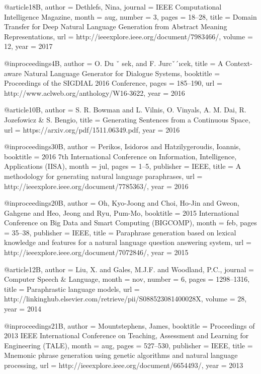 @article{18B,
  author = {Dethlefs, Nina},
  journal = {IEEE Computational Intelligence Magazine},
  month = {aug},
  number = {3},
  pages = {18--28},
  title = {Domain Transfer for Deep Natural Language Generation from Abstract Meaning Representations},
  url = {http://ieeexplore.ieee.org/document/7983466/},
  volume = {12},
  year = {2017}
}

@inproceedings{4B,
  author = {O. Du ˇ sek,  and F. Jurcˇ´ıcek},
  title = {A Context-aware Natural Language Generator for Dialogue Systems},
  booktitle = {Proceedings of the SIGDIAL 2016 Conference},
  pages = {185--190},
  url = {http://www.aclweb.org/anthology/W16-3622},
  year = {2016}
}

@article{10B,
  author = {S. R. Bowman and L. Vilnis, O. Vinyals, A. M. Dai, R. Jozefowicz & S. Bengio},
  title = {Generating Sentences from a Continuous Space},
  url = {https://arxiv.org/pdf/1511.06349.pdf},
  year = {2016}
}

@inproceedings{30B,
author = {Perikos, Isidoros and Hatzilygeroudis, Ioannis},
booktitle = {2016 7th International Conference on Information, Intelligence, Applications (IISA)},
month = {jul},
pages = {1--5},
publisher = {IEEE},
title = {{A methodology for generating natural language paraphrases}},
url = {http://ieeexplore.ieee.org/document/7785363/},
year = {2016}
}

@inproceedings{20B,
author = {Oh, Kyo-Joong and Choi, Ho-Jin and Gweon, Gahgene and Heo, Jeong and Ryu, Pum-Mo},
booktitle = {2015 International Conference on Big Data and Smart Computing (BIGCOMP)},
month = {feb},
pages = {35--38},
publisher = {IEEE},
title = {Paraphrase generation based on lexical knowledge and features for a natural language question answering system},
url = {http://ieeexplore.ieee.org/document/7072846/},
year = {2015}
}

@article{12B,
author = {Liu, X. and Gales, M.J.F. and Woodland, P.C.},
journal = {Computer Speech {\&} Language},
month = {nov},
number = {6},
pages = {1298--1316},
title = {Paraphrastic language models},
url = {http://linkinghub.elsevier.com/retrieve/pii/S088523081400028X},
volume = {28},
year = {2014}
}

@inproceedings{21B,
author = {Mountstephens, James},
booktitle = {Proceedings of 2013 IEEE International Conference on Teaching, Assessment and Learning for Engineering (TALE)},
month = {aug},
pages = {527--530},
publisher = {IEEE},
title = {Mnemonic phrase generation using genetic algorithms and natural language processing},
url = {http://ieeexplore.ieee.org/document/6654493/},
year = {2013}
}

